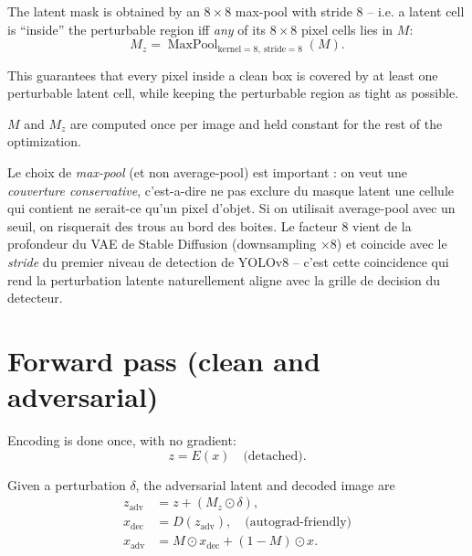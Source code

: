 \documentclass[11pt,a4paper]{article}
\DeclareMathOperator{\MaxPool}{MaxPool}
\begin{document}
\noindent The latent mask is obtained by an $8 \times 8$ max-pool with stride $8$ -- i.e. a
latent cell is ``inside'' the perturbable region iff \emph{any} of its $8 \times 8$
pixel cells lies in $M$:
\begin{equation}
M_z = \MaxPool_{\text{kernel}=8,\ \text{stride}=8}(M).
\end{equation}

This guarantees that every pixel inside a clean box is covered by at least
one perturbable latent cell, while keeping the perturbable region as tight
as possible.

\noindent $M$ and $M_z$ are computed once per image and held constant for the rest
of the optimization.

\begin{supervisornote}
Le choix de \emph{max-pool} (et non average-pool) est important : on veut une
\emph{couverture conservative}, c'est-a-dire ne pas exclure du masque latent
une cellule qui contient ne serait-ce qu'un pixel d'objet. Si on utilisait
average-pool avec un seuil, on risquerait des trous au bord des boites. Le
facteur $8$ vient de la profondeur du VAE de Stable Diffusion (downsampling
$\times 8$) et coincide avec le \emph{stride} du premier niveau de detection
de YOLOv8 -- c'est cette coincidence qui rend la perturbation latente
naturellement aligne avec la grille de decision du detecteur.
\end{supervisornote}

\section{Forward pass (clean and adversarial)}\label{sec:forward}

Encoding is done once, with no gradient:
\begin{equation}
z = E(x) \quad \text{(detached)}.
\end{equation}

\noindent Given a perturbation $\delta$, the adversarial latent and decoded image are
\begin{align}
z_{\text{adv}} &= z + (M_z \odot \delta), \\
x_{\text{dec}} &= D(z_{\text{adv}}), \quad \text{(autograd-friendly)} \\
x_{\text{adv}} &= M \odot x_{\text{dec}} + (1 - M) \odot x. \label{eq:pasteback}
\end{align}
\end{document}
